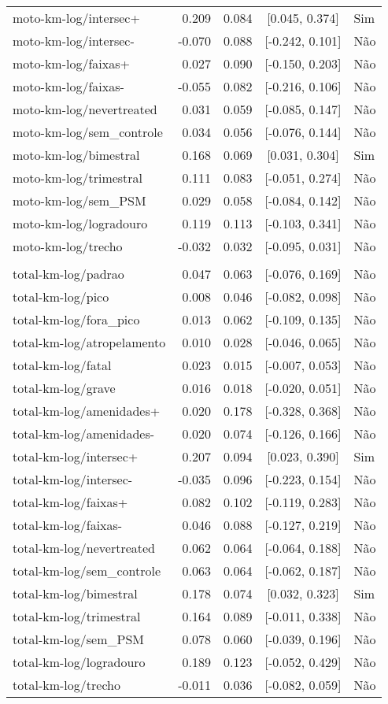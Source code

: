 \begin{longtable}{lrrcl}
moto-km-log/intersec+ & 0.209 & 0.084 & {}[0.045, 0.374] & Sim\\
moto-km-log/intersec- & -0.070 & 0.088 & {}[-0.242, 0.101] & Não\\
moto-km-log/faixas+ & 0.027 & 0.090 & {}[-0.150, 0.203] & Não\\
moto-km-log/faixas- & -0.055 & 0.082 & {}[-0.216, 0.106] & Não\\
moto-km-log/nevertreated & 0.031 & 0.059 & {}[-0.085, 0.147] & Não\\
moto-km-log/sem\_controle & 0.034 & 0.056 & {}[-0.076, 0.144] & Não\\
moto-km-log/bimestral & 0.168 & 0.069 & {}[0.031, 0.304] & Sim\\
moto-km-log/trimestral & 0.111 & 0.083 & {}[-0.051, 0.274] & Não\\
moto-km-log/sem\_PSM & 0.029 & 0.058 & {}[-0.084, 0.142] & Não\\
moto-km-log/logradouro & 0.119 & 0.113 & {}[-0.103, 0.341] & Não\\
moto-km-log/trecho & -0.032 & 0.032 & {}[-0.095, 0.031] & Não\\
 &  &  &  & \\
total-km-log/padrao & 0.047 & 0.063 & {}[-0.076, 0.169] & Não\\
total-km-log/pico & 0.008 & 0.046 & {}[-0.082, 0.098] & Não\\
total-km-log/fora\_pico & 0.013 & 0.062 & {}[-0.109, 0.135] & Não\\
total-km-log/atropelamento & 0.010 & 0.028 & {}[-0.046, 0.065] & Não\\
total-km-log/fatal & 0.023 & 0.015 & {}[-0.007, 0.053] & Não\\
total-km-log/grave & 0.016 & 0.018 & {}[-0.020, 0.051] & Não\\
total-km-log/amenidades+ & 0.020 & 0.178 & {}[-0.328, 0.368] & Não\\
total-km-log/amenidades- & 0.020 & 0.074 & {}[-0.126, 0.166] & Não\\
total-km-log/intersec+ & 0.207 & 0.094 & {}[0.023, 0.390] & Sim\\
total-km-log/intersec- & -0.035 & 0.096 & {}[-0.223, 0.154] & Não\\
total-km-log/faixas+ & 0.082 & 0.102 & {}[-0.119, 0.283] & Não\\
total-km-log/faixas- & 0.046 & 0.088 & {}[-0.127, 0.219] & Não\\
total-km-log/nevertreated & 0.062 & 0.064 & {}[-0.064, 0.188] & Não\\
total-km-log/sem\_controle & 0.063 & 0.064 & {}[-0.062, 0.187] & Não\\
total-km-log/bimestral & 0.178 & 0.074 & {}[0.032, 0.323] & Sim\\
total-km-log/trimestral & 0.164 & 0.089 & {}[-0.011, 0.338] & Não\\
total-km-log/sem\_PSM & 0.078 & 0.060 & {}[-0.039, 0.196] & Não\\
total-km-log/logradouro & 0.189 & 0.123 & {}[-0.052, 0.429] & Não\\
total-km-log/trecho & -0.011 & 0.036 & {}[-0.082, 0.059] & Não\\*
\end{longtable}
